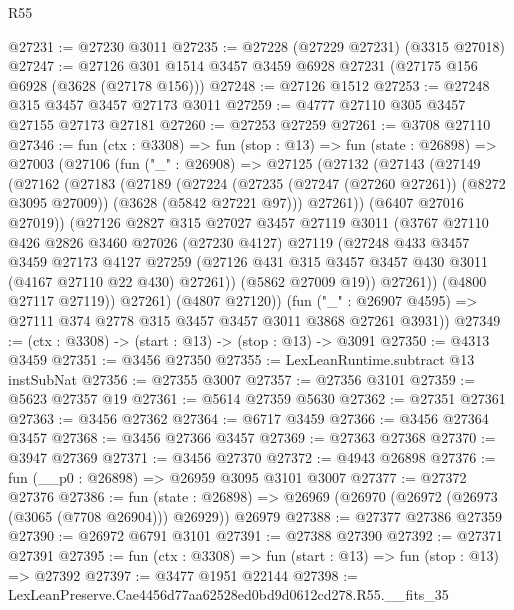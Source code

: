 \begin{lexlean}{R55}
\begin{coremodule}
@27231 := @27230 @3011
@27235 := @27228 (@27229 @27231) (@3315 @27018)
@27247 := @27126 @301 @1514 @3457 @3459 @6928 @27231 (@27175 @156 @6928 (@3628 (@27178 @156)))
@27248 := @27126 @1512
@27253 := @27248 @315 @3457 @3457 @27173 @3011
@27259 := @4777 @27110 @305 @3457 @27155 @27173 @27181
@27260 := @27253 @27259
@27261 := @3708 @27110
@27346 := fun (ctx : @3308) =>
  fun (stop : @13) =>
  fun (state : @26898) =>
  @27003
    (@27106
      (fun ("_" : @26908) =>
      @27125
        (@27132
          (@27143
            (@27149
              (@27162
                (@27183
                  (@27189
                    (@27224
                      (@27235 (@27247 (@27260 @27261)) (@8272 @3095 @27009))
                      (@3628 (@5842 @27221 @97)))
                    @27261))
                (@6407 @27016 @27019))
              (@27126
                @2827
                @315
                @27027
                @3457
                @27119
                @3011
                (@3767
                  @27110
                  @426
                  @2826
                  @3460
                  @27026
                  (@27230 @4127)
                  @27119
                  (@27248
                    @433
                    @3457
                    @3459
                    @27173
                    @4127
                    @27259
                    (@27126 @431 @315 @3457 @3457 @430 @3011 (@4167 @27110 @22 @430) @27261))
                  (@5862 @27009 @19))
                @27261))
            (@4800 @27117 @27119))
          @27261)
        (@4807 @27120))
      (fun ("_" : @26907 @4595) => @27111 @374 @2778 @315 @3457 @3457 @3011 @3868 @27261 @3931))
@27349 := (ctx : @3308) -> (start : @13) -> (stop : @13) -> @3091
@27350 := @4313 @3459
@27351 := @3456 @27350
@27355 := LexLeanRuntime.subtract @13 instSubNat
@27356 := @27355 @3007
@27357 := @27356 @3101
@27359 := @5623 @27357 @19
@27361 := @5614 @27359 @5630
@27362 := @27351 @27361
@27363 := @3456 @27362
@27364 := @6717 @3459
@27366 := @3456 @27364 @3457
@27368 := @3456 @27366 @3457
@27369 := @27363 @27368
@27370 := @3947 @27369
@27371 := @3456 @27370
@27372 := @4943 @26898
@27376 := fun (__p0 : @26898) => @26959 @3095 @3101 @3007
@27377 := @27372 @27376
@27386 := fun (state : @26898) =>
  @26969 (@26970 (@26972 (@26973 (@3065 (@7708 @26904))) @26929)) @26979
@27388 := @27377 @27386 @27359
@27390 := @26972 @6791 @3101
@27391 := @27388 @27390
@27392 := @27371 @27391
@27395 := fun (ctx : @3308) => fun (start : @13) => fun (stop : @13) => @27392
@27397 := @3477 @1951 @22144
@27398 := LexLeanPreserve.Cae4456d77aa62528ed0bd9d0612cd278.R55.__fits_35

\end{coremodule}
\end{lexlean}
